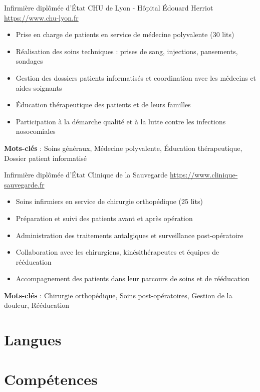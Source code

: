 \documentclass[a4paper, serif, 10pt]{moderncv}
\begin{document}
        {Infirmière diplômée d'État}
        {CHU de Lyon - Hôpital Édouard Herriot}
        {\url{https://www.chu-lyon.fr}}
        {}
        {\begin{itemize}
\item Prise en charge de patients en service de médecine polyvalente (30 lits)
\item Réalisation des soins techniques : prises de sang, injections, pansements, sondages
\item Gestion des dossiers patients informatisés et coordination avec les médecins et aides-soignants
\item Éducation thérapeutique des patients et de leurs familles
\item Participation à la démarche qualité et à la lutte contre les infections nosocomiales
\end{itemize}
\textbf{Mots-clés} : Soins généraux, Médecine polyvalente, Éducation thérapeutique, Dossier patient informatisé}

        {Infirmière diplômée d'État}
        {Clinique de la Sauvegarde}
        {\url{https://www.clinique-sauvegarde.fr}}
        {}
        {\begin{itemize}
\item Soins infirmiers en service de chirurgie orthopédique (25 lits)
\item Préparation et suivi des patients avant et après opération
\item Administration des traitements antalgiques et surveillance post-opératoire
\item Collaboration avec les chirurgiens, kinésithérapeutes et équipes de rééducation
\item Accompagnement des patients dans leur parcours de soins et de rééducation
\end{itemize}
\textbf{Mots-clés} : Chirurgie orthopédique, Soins post-opératoires, Gestion de la douleur, Rééducation}
\section{Langues}

\section{Compétences}
\end{document}
